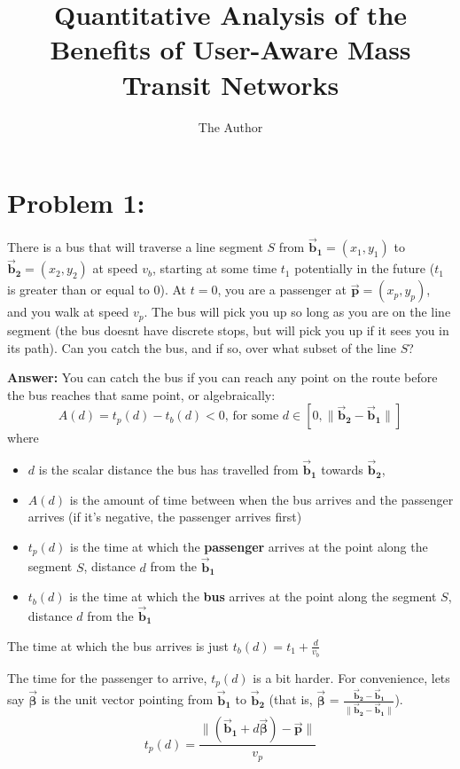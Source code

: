 \documentclass[11pt]{article} %
\title{Quantitative Analysis of the Benefits of User-Aware Mass Transit Networks}
\author{The Author}
\date{}
\begin{document}
\maketitle

\section*{Problem 1: }
There is a bus that will traverse a line segment $S$ from $\bm{\vec{b}_1} = (x_1, y_1)$ to  $\bm{\vec{b}_2} = (x_2, y_2)$ at speed $v_b$, starting at some time $t_1$ potentially in the future ($t_1$ is greater than or equal to 0). At $t=0$, you are a passenger at $\bm{\vec{p}} = (x_p, y_p)$, and you walk at speed $v_p$. The bus will pick you up so long as you are on the line segment (the bus doesnt have discrete stops, but will pick you up if it sees you in its path). Can you catch the bus, and if so, over what subset of the line $S$?

 \vspace{0.5cm}\noindent \textbf{Answer: } 
 You can catch the bus if you can reach any point on the route before the bus reaches that same point, or algebraically:
$$A(d) =  t_p(d) - t_b(d) < 0 \mbox{, for some } d \in [0,  \|\bm{\vec{b}_2} - \bm{\vec{b}_1}\|] $$
where 
\begin{itemize}
\item $d$ is the scalar distance the bus has travelled from $\bm{\vec{b}_1}$ towards $\bm{\vec{b}_2}$,
\item $A(d)$ is the amount of time between when the bus arrives and the passenger arrives (if it's negative, the passenger arrives first)
\item $t_p(d)$ is the time at which the \textbf{passenger} arrives at the point along the segment $S$, distance $d$ from the $\bm{\vec{b}_1}$
\item $t_b(d)$ is the time at which the \textbf{bus} arrives at the point along the segment $S$, distance $d$ from the $\bm{\vec{b}_1}$
\end{itemize}

The time at which the bus arrives is just $t_b(d) = t_1 + \frac{d}{v_b}$

The time for the passenger to arrive, $t_p(d)$ is a bit harder. 
For convenience, lets say  $\bm{\vec{\beta}}$ is the unit vector pointing from $\bm{\vec{b}_1}$ to $\bm{\vec{b}_2}$ (that is,  $\bm{\vec{\beta}}$ = $\frac{\bm{\vec{b}_2} - \bm{\vec{b}_1}}{\|\bm{\vec{b}_2} - \bm{\vec{b}_1}\|}$).
$$ t_p(d) = \frac{ \| (\bm{\vec{b}_1} + d\bm{\vec{\beta}}) - \bm{\vec{p}} \|} {v_p} $$
\end{document}
